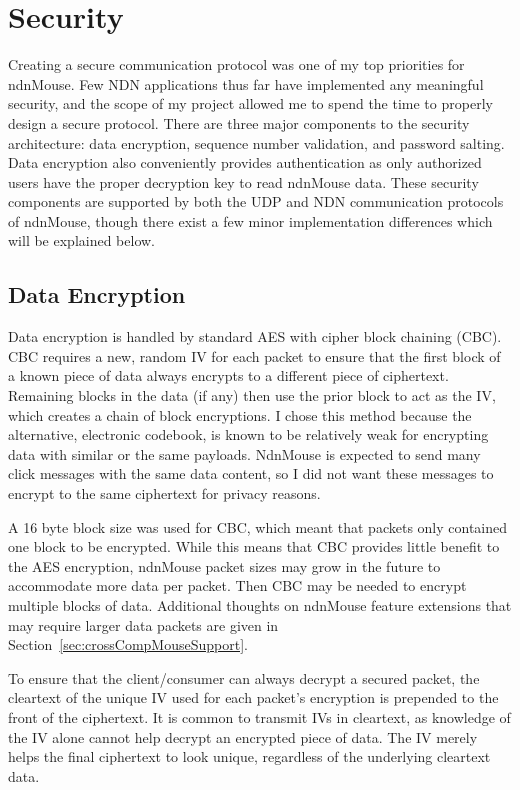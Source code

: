 \documentclass{sig-alternate}
\renewcommand\_{\textunderscore\allowbreak}  %
\begin{document}
\section{Security}
\label{sec:security}
Creating a secure communication protocol was one of my top priorities for ndnMouse. Few NDN applications thus far have implemented any meaningful security, and the scope of my project allowed me to spend the time to properly design a secure protocol. There are three major components to the security architecture: data encryption, sequence number validation, and password salting. Data encryption also conveniently provides authentication as only authorized users have the proper decryption key to read ndnMouse data. These security components are supported by both the UDP and NDN communication protocols of ndnMouse, though there exist a few minor implementation differences which will be explained below.

\subsection{Data Encryption}
Data encryption is handled by standard AES with cipher block chaining (CBC). CBC requires a new, random IV for each packet to ensure that the first block of a known piece of data always encrypts to a different piece of ciphertext. Remaining blocks in the data (if any) then use the prior block to act as the IV, which creates a chain of block encryptions. I chose this method because the alternative, electronic codebook, is known to be relatively weak for encrypting data with similar or the same payloads. NdnMouse is expected to send many click messages with the same data content, so I did not want these messages to encrypt to the same ciphertext for privacy reasons. 

A 16 byte block size was used for CBC, which meant that packets only contained one block to be encrypted. While this means that CBC provides little benefit to the AES encryption, ndnMouse packet sizes may grow in the future to accommodate more data per packet. Then CBC may be needed to encrypt multiple blocks of data. Additional thoughts on ndnMouse feature extensions that may require larger data packets are given in Section~\ref{sec:crossCompMouseSupport}.

To ensure that the client/consumer can always decrypt a secured packet, the cleartext of the unique IV used for each packet's encryption is prepended to the front of the ciphertext. It is common to transmit IVs in cleartext, as knowledge of the IV alone cannot help decrypt an encrypted piece of data. The IV merely helps the final ciphertext to look unique, regardless of the underlying cleartext data.
\end{document}
